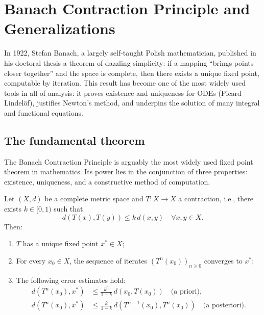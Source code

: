 \chapter{Banach Contraction Principle and Generalizations}\label{ch:banach}

In 1922, Stefan Banach, a largely self-taught Polish mathematician, published
in his doctoral thesis a theorem of dazzling simplicity: if a mapping
``brings points closer together'' and the space is complete, then there
exists a unique fixed point, computable by iteration. This result has become
one of the most widely used tools in all of analysis: it proves existence
and uniqueness for ODEs (Picard--Lindel\"of), justifies Newton's method, and
underpins the solution of many integral and functional equations.

\section{The fundamental theorem}

The Banach Contraction Principle is arguably the most widely used fixed point
theorem in mathematics. Its power lies in the conjunction of three properties:
existence, uniqueness, and a constructive method of computation.

\begin{theorem}\label{thm:banach}
Let $(X, d)$ be a complete metric space and $T : X \to X$ a contraction, i.e.,
there exists $k \in [0, 1)$ such that
\[
    d(T(x), T(y)) \leq k \, d(x, y) \quad \forall x, y \in X.
\]
Then:
\begin{enumerate}
    \item $T$ has a unique fixed point $x^* \in X$;
    \item For every $x_0 \in X$, the sequence of iterates $(T^n(x_0))_{n \geq 0}$
          converges to $x^*$;
    \item The following error estimates hold:
    \begin{align}
        d(T^n(x_0), x^*) &\leq \frac{k^n}{1 - k} \, d(x_0, T(x_0))
        \quad \text{(a priori)}, \label{eq:apriori} \\
        d(T^n(x_0), x^*) &\leq \frac{k}{1 - k} \, d(T^{n-1}(x_0), T^n(x_0))
        \quad \text{(a posteriori)}. \label{eq:aposteriori}
    \end{align}
\end{enumerate}
\end{theorem}

